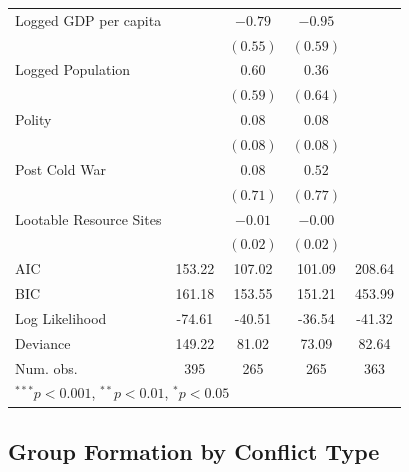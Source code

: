 \documentclass[12pt,]{book}
\let\origtable\table
\let\endorigtable\endtable
\renewenvironment{table}[1][2] {
    \singlespacing
    \expandafter\origtable\expandafter[H]
} {
    \endorigtable
}
\theoremstyle{definition}
\theoremstyle{definition}
\theoremstyle{definition}
\theoremstyle{remark}
\begin{document}
\begin{table}
\begin{center}
\begin{tabular}{l c c c c }
Logged GDP per capita             &               & $-0.79$  & $-0.95$      &              \\
                                  &               & $(0.55)$ & $(0.59)$     &              \\
Logged Population                 &               & $0.60$   & $0.36$       &              \\
                                  &               & $(0.59)$ & $(0.64)$     &              \\
Polity                            &               & $0.08$   & $0.08$       &              \\
                                  &               & $(0.08)$ & $(0.08)$     &              \\
Post Cold War                     &               & $0.08$   & $0.52$       &              \\
                                  &               & $(0.71)$ & $(0.77)$     &              \\
Lootable Resource Sites           &               & $-0.01$  & $-0.00$      &              \\
                                  &               & $(0.02)$ & $(0.02)$     &              \\
\hline
AIC                               & 153.22        & 107.02   & 101.09       & 208.64       \\
BIC                               & 161.18        & 153.55   & 151.21       & 453.99       \\
Log Likelihood                    & -74.61        & -40.51   & -36.54       & -41.32       \\
Deviance                          & 149.22        & 81.02    & 73.09        & 82.64        \\
Num. obs.                         & 395           & 265      & 265          & 363          \\
\hline
\multicolumn{5}{l}{\scriptsize{$^{***}p<0.001$, $^{**}p<0.01$, $^*p<0.05$}}
\end{tabular}
\caption{Logit Models of Rebel Group Formation (Conflict-Years with > 1000 Fatalities)}
\label{tab:entry-wars}
\end{center}
\end{table}

\hypertarget{group-formation-by-conflict-type}{%
\subsection*{Group Formation by Conflict
Type}\label{group-formation-by-conflict-type}}
\end{document}
